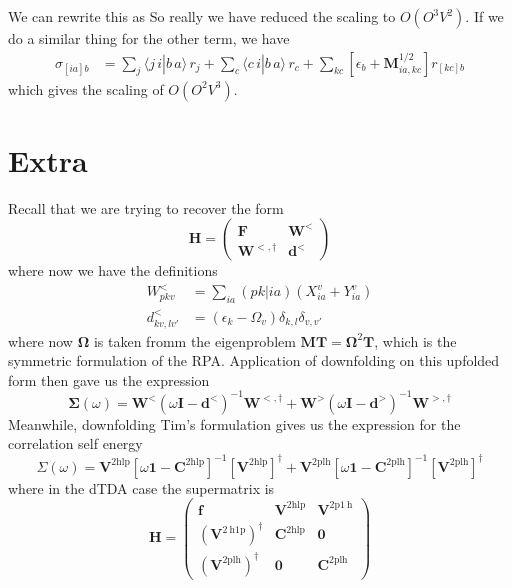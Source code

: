 We can rewrite this as
So really we have reduced the scaling to $O(O^3V^2)$. If we do a similar thing for the other term, we have
\begin{align}
\sigma_{[ia]b} &= 
    \sum_{j} \bigl\langle j\,i | b\,a \bigr\rangle\,r_j
    + \sum_{c} \bigl\langle c\,i | b\,a \bigr\rangle\,r_c
    + \sum_{kc} \left[\epsilon_b + \bm{M}^{1/2}_{ia,kc}\right] r_{[kc] b}
\end{align}
which gives the scaling of $O(O^2V^3)$.
\section{Extra}
Recall that we are trying to recover the form 
\begin{equation}
    \bm{H} = \begin{pmatrix} \bm{F} & \bm{W}^<\\ \bm{W}^{<,\dagger} & \bm{d}^< \end{pmatrix}
\label{eq:booth_upfolded_hamiltonian2}
\end{equation}
where now we have the definitions
\begin{align}
    W_{pkv}^{<} &= \sum_{ia} (pk|ia) \left( X_{ia}^{v} + Y_{ia}^{v} \right) \\
    d_{kv,lv'}^{<} &= \left(\epsilon_k - \Omega_v\right) \delta_{k,l} \delta_{v,v'}
\label{eq:booth_definitions2}
\end{align}
where now $\bm{\Omega }$ is taken fromm the eigenproblem $\bm{M}\bm{T}= \bm{\Omega}^2 \bm{T}$, which is the symmetric formulation of the RPA.
Application of downfolding on this upfolded form then gave us the expression
\begin{equation}
    \mathbf{\Sigma }(\omega )=\mathbf{W}^<(\omega \mathbf{I}-{\mathbf{d}^<})^{-1} {\mathbf{W}}^{<,\dagger} + \mathbf{W}^>(\omega \mathbf{I}-{\mathbf{d}^>})^{-1} {\mathbf{W}}^{>,\dagger}
\label{eq:booth_self_energy}
\end{equation}
Meanwhile, downfolding Tim's formulation gives us the expression for the correlation self energy
\begin{equation}
    \Sigma(\omega)= \mathbf{V}^{2 \mathrm{hlp}}\left[\omega \mathbf{1}-\mathbf{C}^{2 \mathrm{hlp}}\right]^{-1}\left[\mathbf{V}^{2 \mathrm{hlp}}\right]^{\dagger} +\mathbf{V}^{2 \mathrm{plh}}\left[\omega \mathbf{1}-\mathbf{C}^{2 \mathrm{plh}}\right]^{-1}\left[\mathbf{V}^{2 \mathrm{plh}}\right]^{\dagger}
\end{equation}
where in the dTDA case the supermatrix is
\begin{equation}
    \mathbf{H}=\left(\begin{array}{ccc}
\mathbf{f} & \mathbf{V}^{2 \mathrm{hlp}} & \mathbf{V}^{2 \mathrm{p} 1 \mathrm{~h}} \\
\left(\mathbf{V}^{2 \mathrm{~h} 1 \mathrm{p}}\right)^{\dagger} & \mathbf{C}^{2 \mathrm{hlp}} & \mathbf{0} \\
\left(\mathbf{V}^{2 \mathrm{plh}}\right)^{\dagger} & \mathbf{0} & \mathbf{C}^{2 \mathrm{plh}}
\end{array}\right)
\end{equation}
